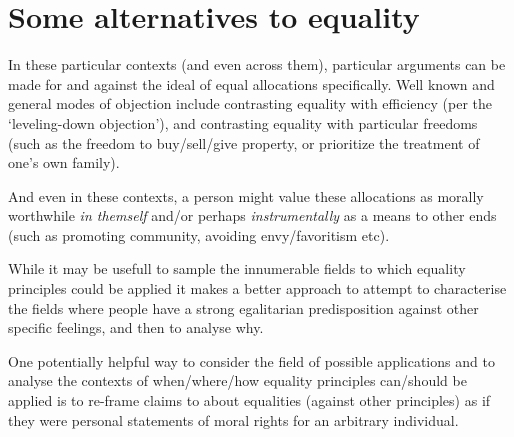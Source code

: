 





\section{Some alternatives to equality}

In these particular contexts (and even across them), particular arguments can be made for and against the ideal of equal allocations specifically.
Well known and general modes of objection include contrasting equality with efficiency (per the `leveling-down objection'), and contrasting equality with particular freedoms (such as the freedom to buy/sell/give property, or prioritize the treatment of one's own family).



And even in these contexts, a person might value these allocations as morally worthwhile \textit{in themself} and/or perhaps \textit{instrumentally} as a means to other ends (such as promoting community, avoiding envy/favoritism etc).

While it may be usefull to sample the innumerable fields to which equality principles could be applied it makes a better approach to attempt to characterise the fields where people have a strong egalitarian predisposition against other specific feelings, and then to analyse why.



One potentially helpful way to consider the field of possible applications and to analyse the contexts of when/where/how equality principles can/should be applied is to re-frame claims to about equalities (against other principles) as if they were personal statements of moral rights for an arbitrary individual.

